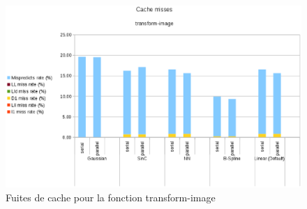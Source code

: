 \documentclass[10pt]{report}
\begin{document}
%		
			\begin{figure}[h!]
				\begin{center}
					\includegraphics[width=15cm]{Reports/figures/cache_misses_transform_image.eps}
				\end{center}	
				\caption{Fuites de cache pour la fonction transform-image}
				\label{Fuites de cache pour la fonction transform-image}
			\end{figure}~\par

\end{document}
